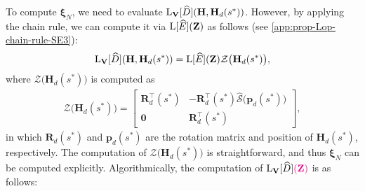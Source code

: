 To compute $\boldsymbol{\xi}_N$, we need to evaluate $\operatorname{L}_\mathbf{V}[\widehat{D}](\mathbf{H}, \mathbf{H}_d(s^*))$. However, by applying the chain rule, we can compute it via $\operatorname{L}[\widehat{E}](\mathbf{Z})$ as follows (see \cref{app:prop-Lop-chain-rule-SE3}):
\begin{align}
    \operatorname{L}_\mathbf{V}[\widehat{D}](\mathbf{H}, \mathbf{H}_d(s^*)) = \operatorname{L}[\widehat{E}](\mathbf{Z})\mathcal{Z}\bigl(\mathbf{H}_d(s^*)\bigr),
\end{align}
where $\mathcal{Z}\bigl(\mathbf{H}_d(s^*)\bigr)$ is computed as
\begin{align}
    \mathcal{Z}\bigl(\mathbf{H}_d(s^*)\bigr) = \begin{bmatrix}
        \mathbf{R}_d^\top(s^*) & -\mathbf{R}_d^\top(s^*)\widehat{\mathcal{S}}\bigl(\mathbf{p}_d(s^*)\bigr)\\
        \mathbf{0} & \mathbf{R}_d^\top(s^*)
    \end{bmatrix}, \label{eq:explicit-EE-dista-SE3-component-Zmap}
\end{align}
in which $\mathbf{R}_d(s^*)$ and $\mathbf{p}_d(s^*)$ are the rotation matrix and position of $\mathbf{H}_d(s^*)$, respectively. The computation of $\mathcal{Z}\bigl(\mathbf{H}_d(s^*)\bigr)$ is straightforward, and thus $\boldsymbol{\xi}_N$ can be computed explicitly. Algorithmically, the computation of $\operatorname{L}_\mathbf{V}[\widehat{D}]\textcolor{magenta}{(\mathbf{Z})}$ is as follows:
